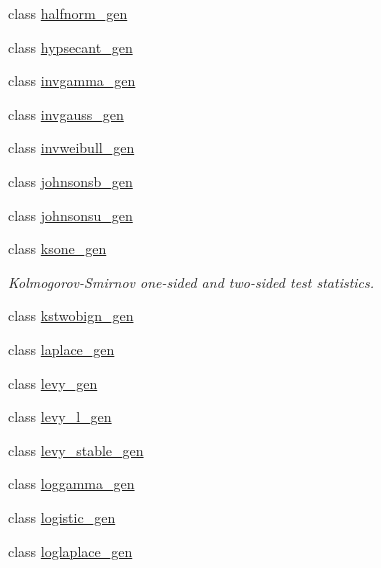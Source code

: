 \begin{DoxyCompactItemize}
\item 
class \hyperlink{classscipy_1_1stats_1_1__continuous__distns_1_1halfnorm__gen}{halfnorm\+\_\+gen}
\item 
class \hyperlink{classscipy_1_1stats_1_1__continuous__distns_1_1hypsecant__gen}{hypsecant\+\_\+gen}
\item 
class \hyperlink{classscipy_1_1stats_1_1__continuous__distns_1_1invgamma__gen}{invgamma\+\_\+gen}
\item 
class \hyperlink{classscipy_1_1stats_1_1__continuous__distns_1_1invgauss__gen}{invgauss\+\_\+gen}
\item 
class \hyperlink{classscipy_1_1stats_1_1__continuous__distns_1_1invweibull__gen}{invweibull\+\_\+gen}
\item 
class \hyperlink{classscipy_1_1stats_1_1__continuous__distns_1_1johnsonsb__gen}{johnsonsb\+\_\+gen}
\item 
class \hyperlink{classscipy_1_1stats_1_1__continuous__distns_1_1johnsonsu__gen}{johnsonsu\+\_\+gen}
\item 
class \hyperlink{classscipy_1_1stats_1_1__continuous__distns_1_1ksone__gen}{ksone\+\_\+gen}
\begin{DoxyCompactList}\small\item\em Kolmogorov-\/\+Smirnov one-\/sided and two-\/sided test statistics. \end{DoxyCompactList}\item 
class \hyperlink{classscipy_1_1stats_1_1__continuous__distns_1_1kstwobign__gen}{kstwobign\+\_\+gen}
\item 
class \hyperlink{classscipy_1_1stats_1_1__continuous__distns_1_1laplace__gen}{laplace\+\_\+gen}
\item 
class \hyperlink{classscipy_1_1stats_1_1__continuous__distns_1_1levy__gen}{levy\+\_\+gen}
\item 
class \hyperlink{classscipy_1_1stats_1_1__continuous__distns_1_1levy__l__gen}{levy\+\_\+l\+\_\+gen}
\item 
class \hyperlink{classscipy_1_1stats_1_1__continuous__distns_1_1levy__stable__gen}{levy\+\_\+stable\+\_\+gen}
\item 
class \hyperlink{classscipy_1_1stats_1_1__continuous__distns_1_1loggamma__gen}{loggamma\+\_\+gen}
\item 
class \hyperlink{classscipy_1_1stats_1_1__continuous__distns_1_1logistic__gen}{logistic\+\_\+gen}
\item 
class \hyperlink{classscipy_1_1stats_1_1__continuous__distns_1_1loglaplace__gen}{loglaplace\+\_\+gen}
\item 

\end{DoxyCompactItemize}
